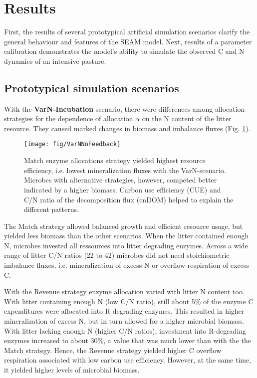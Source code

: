 \section{Results}

First, the results of several prototypical artificial simulation scenarios
clarify the general behaviour and features of the SEAM model. Next, results of a
parameter calibration demonstrates the model's ability to
simulate the observed C and N dynamics of an intensive pasture.

\subsection{Prototypical simulation scenarios}
\label{sec:ResultsProto}

With the \textbf{VarN-Incubation} scenario, there were differences among
allocation strategies for the dependence of allocation $\alpha$ on the N
content of the litter resource. They caused marked changes in biomass and
imbalance fluxes (Fig. \ref{fig:VarNNoFeedback}).
 
\begin{figure}[t] \vspace*{2mm}
\begin{center}
\texttt{[image: fig/VarNNoFeedback]}
\end{center}
\caption{
Match enzyme allocations strategy yielded highest resource efficiency, i.e.
lowest mineralization fluxes with the VarN-scenario. Microbes with alternative
strategies, however, competed better indicated by a higher biomass. Carbon use
efficiency (CUE) and C/N ratio of the decomposition flux (cnDOM) helped to
explain the different patterns.
\label{fig:VarNNoFeedback}}
\end{figure}

The Match strategy allowed balanced growth and efficient resource usage, but
yielded less biomass than the other scenarios. When the litter contained enough
N, microbes invested all ressources into litter degrading enzymes.
Across a wide range of litter C/N ratios (22 to 42) microbes did not need
stoichiometric imbalance fluxes, i.e. mineralization of excess N
or overflow respiration of excess C.  

With the Revenue strategy enzyme allocation varied with litter N content too.
With litter containing enough N (low C/N ratio), still about 5\% of the enzyme C
expenditures were allocated into R degrading enzymes. This resulted in higher
mineralization of excess N, but in turn allowed for a higher microbial biomass.
With litter lacking enough N (higher C/N ratios), investment into R-degrading enzymes
increased to about 30\%, a value that was much lower than with the the Match
strategy. Hence, the Revenue strategy yielded higher C overflow respiration
associated with low carbon use efficiency. However, at the same time, it
yielded higher levels of microbial biomass.

